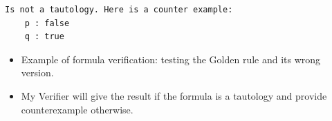 \documentclass[a0,landscape]{a0poster}
\def\graphspacing{\vspace{.5cm}}
\newcommand{\capcolor}[1]{{\color{Black} #1}}
\newcommand{\var}[1]{{\small \textit{#1}}}
\begin{document}
\begin{multicols}{4}
\begin{lstlisting}
Is not a tautology. Here is a counter example: 
    p : false
    q : true
\end{lstlisting}
\begin{itemize}
\item Example of formula verification: testing the Golden rule and its wrong version.
\item My Verifier will give the result if the formula is a tautology and provide counterexample otherwise.
\end{itemize}
%
%
%
%
%
%
%
%
%
%


\end{multicols}
\end{document}

